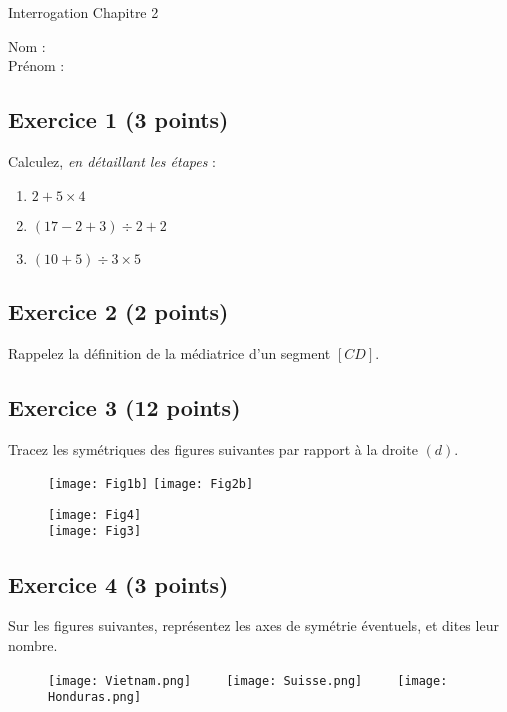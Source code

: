 \documentclass[14 pt]{extarticle}
\theoremstyle{plain}
\begin{document}
\newpage

\begin{center}{\Large Interrogation Chapitre 2}\\ 
 \end{center}
 Nom : \\
 Prénom : \\
 \subsection*{Exercice 1 (3 points)}
 Calculez, \emph{en détaillant les étapes} : 
 \begin{enumerate}
 \item $2 + 5 \times 4$
 \item $(17 -2 + 3) \div 2 +2 $
 \item $ (10 + 5)\div 3 \times 5$
 \end{enumerate}
 \subsection*{Exercice 2 (2 points)}
 
 Rappelez la définition de la médiatrice d'un segment $[CD]$. 
 
 \subsection*{Exercice 3 (12 points)}
 
 Tracez les symétriques des figures suivantes par rapport à la droite $(d)$.
 
 \begin{figure}[H]
 \center
 \texttt{[image: Fig1b]}
 \texttt{[image: Fig2b]}
 \end{figure}
 \newpage
  \begin{figure}[H]
 \center
 \texttt{[image: Fig4]}\\
 \texttt{[image: Fig3]}
 \end{figure}
 
\subsection*{Exercice 4 (3 points)} 

Sur les figures suivantes, représentez les axes de symétrie éventuels, et dites leur nombre.  

\begin{figure}[H]
\center 
\texttt{[image: Vietnam.png]}\ \ \ \ \ 
\texttt{[image: Suisse.png]}\ \ \ \ \ 
\texttt{[image: Honduras.png]}
\end{figure}







 	
\end{document}
